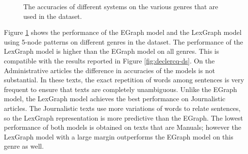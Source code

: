 \begin{figure}[!ht]
  \begin{center}
      \mydata
  \end{center}
  \caption{The accuracies of different systems on the various genres that are used in the \declercqds dataset.}
  \label{fig:declercq-genre}
\end{figure}

Figure \ref{fig:declercq-genre} shows the performance of the EGraph model and the LexGraph model using 5-node patterns on different genres in the \declercqds dataset. 
The performance of the LexGraph model is higher than the EGraph model on all genres. 
This is compatible with the results reported in Figure \ref{fig:declercq-ds}. 
On the Administrative articles the difference in accuracies of the models is not substantial.  
In these texts, the exact repetition of words among sentences is very frequent to ensure that texts are completely unambiguous. 
Unlike the EGraph model, the LexGraph model achieves the best performance on Journalistic articles. 
The Journalistic texts use more variations of words to relate sentences, so the LexGraph representation is more predictive than the EGraph. 
The lowest performance of both models is obtained on texts that are Manuals; however the LexGraph model with a large margin outperforms the EGraph model on this genre as well. 

